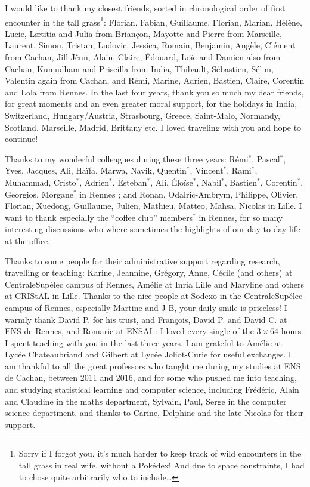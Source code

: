 \begin{acknowledgements}
I would like to thank my closest friends, sorted in chronological order of first encounter in the tall grass\footnote{Sorry if I forgot you, it's much harder to keep track of wild encounters in the tall grass in real wife, without a Pokédex! And due to space constraints, I had to chose quite arbitrarily who to include\dots}: Florian, Fabian, Guillaume, Florian, Marian, Hélène, Lucie, Lætitia and Julia from Briançon, Mayotte and Pierre from Marseille, Laurent, Simon, Tristan, Ludovic, Jessica, Romain, Benjamin, Angèle, Clément from Cachan, Jill-Jênn, Alain, Claire, Édouard, Loïc and Damien also from Cachan, Kumudham and Priscilla from India, Thibault, Sébastien, Sélim, Valentin again from Cachan, and Rémi, Marine, Adrien, Bastien, Claire, Corentin and Lola from Rennes.
In the last four years, thank you so much my dear friends, for great moments and an even greater moral support, for the holidays in India, Switzerland, Hungary/Austria, Strasbourg, Greece, Saint-Malo, Normandy, Scotland, Marseille, Madrid, Brittany etc. I loved traveling with you and hope to continue!

Thanks to my wonderful colleagues during these three years: Rémi$^*$, Pascal$^*$, Yves, Jacques, Ali, Haïfa, Marwa, Navik, Quentin$^*$, Vincent$^*$, Rami$^*$, Muhammad, Cristo$^*$, Adrien$^*$, Esteban$^*$, Ali, Éloïse$^*$, Nabil$^*$, Bastien$^*$, Corentin$^*$, Georgios, Morgane$^*$ in Rennes ; and Ronan, Odalric-Ambrym, Philippe, Olivier, Florian, Xuedong, Guillaume, Julien, Mathieu, Matteo, Mahsa, Nicolas in Lille.
I want to thank especially the ``coffee club'' members$^*$ in Rennes, for so many interesting discussions who where sometimes the highlights of our day-to-day life at the office.

Thanks to some people for their administrative support regarding research, travelling or teaching: Karine, Jeannine, Grégory, Anne, Cécile (and others) at CentraleSupélec campus of Rennes, Amélie at Inria Lille and Maryline and others at CRIStAL in Lille.
Thanks to the nice people at Sodexo in the CentraleSupélec campus of Rennes, especially Martine and J-B, your daily smile is priceless!
I warmly thank David P. for his trust, and François, David P. and David C. at ENS de Rennes, and Romaric at ENSAI : I loved every single of the $3 \times 64$ hours I spent teaching with you in the last three years.
I am grateful to Amélie at Lycée Chateaubriand and Gilbert at Lycée Joliot-Curie for useful exchanges.
%
I am thankful to all the great professors who taught me during my studies at ENS de Cachan, between 2011 and 2016, and for some who pushed me into teaching, and studying statistical learning and computer science, including Frédéric, Alain and Claudine in the maths department, Sylvain, Paul, Serge in the computer science department, and thanks to Carine, Delphine and the late Nicolas for their support.



\end{acknowledgements}
